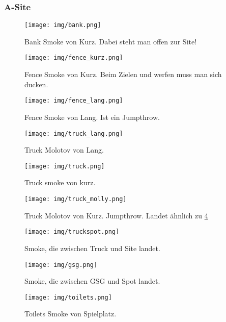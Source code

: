 \subsubsection{A-Site}
\begin{figure}
    \centering
    \texttt{[image: img/bank.png]}
    \caption{Bank Smoke von Kurz. Dabei steht man offen zur Site!}
    \label{fig:Bank_smoke}
\end{figure}
\begin{figure}
    \centering
    \texttt{[image: img/fence\_kurz.png]}
    \caption{Fence Smoke von Kurz. Beim Zielen und werfen muss man sich ducken.}
    \label{fig:fence_smoke_kurz}
\end{figure}
\begin{figure}
    \centering
    \texttt{[image: img/fence\_lang.png]}
    \caption{Fence Smoke von Lang. Ist ein Jumpthrow.}
    \label{fig:fence_smoke_lang}
\end{figure}
\begin{figure}
    \centering
    \texttt{[image: img/truck\_lang.png]}
    \caption{Truck Molotov von Lang.}
    \label{fig:truck_lang}
\end{figure}
\begin{figure}
    \centering
    \texttt{[image: img/truck.png]}
    \caption{Truck smoke von kurz.}
    \label{fig:truck_kurz}
\end{figure}
\begin{figure}
    \centering
    \texttt{[image: img/truck\_molly.png]}
    \caption{Truck Molotov von Kurz. Jumpthrow. Landet ähnlich zu \ref{fig:truck_lang}}
    \label{fig:truck_molly}
\end{figure}
\begin{figure}
    \centering
    \texttt{[image: img/truckspot.png]}
    \caption{Smoke, die zwischen Truck und Site landet.}
    \label{fig:truckspot}
\end{figure}
\begin{figure}
    \centering
    \texttt{[image: img/gsg.png]}
    \caption{Smoke, die zwischen GSG und Spot landet.}
    \label{fig:gsg_smoke}
\end{figure}
\begin{figure}
    \centering
    \texttt{[image: img/toilets.png]}
    \caption{Toilets Smoke von Spielplatz.}
    \label{fig:toilets}
\end{figure}
\FloatBarrier
